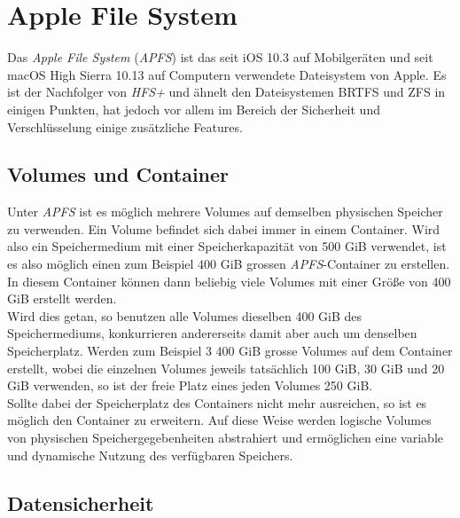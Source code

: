 \section{Apple File System}
Das \textit{Apple File System} (\textit{APFS}) ist das seit iOS 10.3 auf Mobilgeräten und seit macOS High Sierra 10.13 auf Computern verwendete Dateisystem von Apple. Es ist der Nachfolger von \textit{HFS+} und ähnelt den Dateisystemen BRTFS und ZFS in einigen Punkten, hat jedoch vor allem im Bereich der Sicherheit und Verschlüsselung einige zusätzliche Features\cite{golem, apple_filesystem_reference}.

\subsection{Volumes und Container}
Unter \textit{APFS} ist es möglich mehrere Volumes auf demselben physischen Speicher zu verwenden\cite{about_apfs}. Ein Volume befindet sich dabei immer in einem Container. Wird also ein Speichermedium mit einer Speicherkapazität von 500 GiB verwendet, ist es also möglich einen zum Beispiel 400 GiB grossen \textit{APFS}-Container zu erstellen. In diesem Container können dann beliebig viele Volumes mit einer Größe von 400 GiB erstellt werden.\\
Wird dies getan, so benutzen alle Volumes dieselben 400 GiB des Speichermediums, konkurrieren andererseits damit aber auch um denselben Speicherplatz. Werden zum Beispiel 3 400 GiB grosse Volumes auf dem Container erstellt, wobei die einzelnen Volumes jeweils tatsächlich 100 GiB, 30 GiB und 20 GiB verwenden, so ist der freie Platz eines jeden Volumes 250 GiB\cite{golem}.\\
Sollte dabei der Speicherplatz des Containers nicht mehr ausreichen, so ist es möglich den Container zu erweitern. Auf diese Weise werden logische Volumes von physischen Speichergegebenheiten abstrahiert und ermöglichen eine variable und dynamische Nutzung des verfügbaren Speichers.

\subsection{Datensicherheit}

